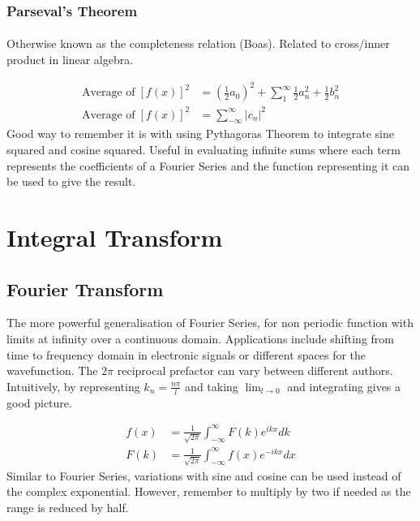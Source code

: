 \documentclass[12pt]{article}
\begin{document}
\subsubsection{Parseval's Theorem}

\paragraph{} Otherwise known as the completeness relation (Boas). Related to cross/inner product in linear algebra. 

\begin{align*}
\text{Average of} \; [f(x)]^2 &= (\frac12 a_0)^2 + \sum^\infty_1 \frac12 a_n^2 + \frac12 b_n^2 \\
\text{Average of} \; [f(x)]^2 &= \sum^\infty_{-\infty} |c_n|^2
\end{align*}
Good way to remember it is with using Pythagoras Theorem to integrate sine squared and cosine squared. Useful in evaluating infinite sums where each term represents the coefficients of a Fourier Series and the function representing it can be used to give the result.

\section{Integral Transform}

\subsection{Fourier Transform}

The more powerful generalisation of Fourier Series, for non periodic function with limits at infinity over a continuous domain. Applications include shifting from time to frequency domain in electronic signals or different spaces for the wavefunction. The $2\pi$ reciprocal prefactor can vary between different authors. Intuitively, by representing $k_n = \frac{n\pi}{l}$ and taking $\lim_{l \to 0}$ and integrating gives a good picture.

\begin{align*}
f(x) &= \frac{1}{\sqrt{2\pi}}\int^\infty_{-\infty} F(k)e^{ikx} dk \\
F(k) &= \frac{1}{\sqrt{2\pi}}\int^\infty_{-\infty} f(x)e^{-ikx} dx
\end{align*}
Similar to Fourier Series, variations with sine and cosine can be used instead of the complex exponential. However, remember to multiply by two if needed as the range is reduced by half. 
\end{document}
